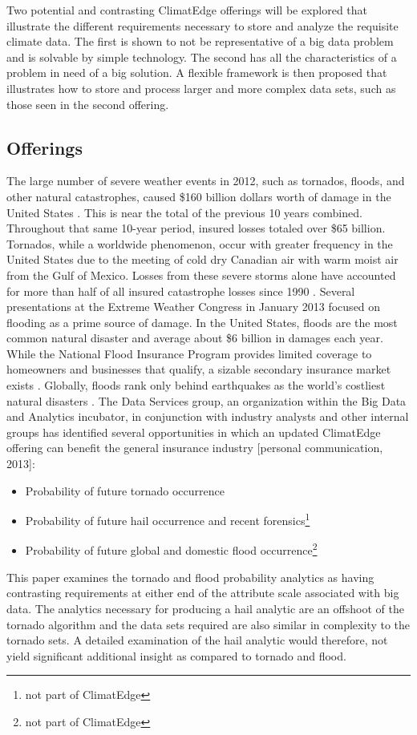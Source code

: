 Two potential and contrasting ClimatEdge offerings will be explored that illustrate the different requirements necessary to store and analyze the requisite climate data. The first is shown to not be representative of a big data problem and is solvable by simple technology. The second has all the characteristics of a problem in need of a big solution. A flexible framework is then proposed that illustrates how to store and process larger and more complex data sets, such as those seen in the second offering.
\subsection{Offerings}
The large number of severe weather events in 2012, such as tornados, floods, and other natural catastrophes, caused \$160 billion dollars worth of damage in the United States \cite{stalder}. This is near the total of the previous 10 years combined. Throughout that same 10-year period, insured losses totaled over \$65 billion. Tornados, while a worldwide phenomenon, occur with greater frequency in the United States due to the meeting of cold dry Canadian air with warm moist air from the Gulf of Mexico. Losses from these severe storms alone have accounted for more than half of all insured catastrophe losses since 1990 \cite{lloyds}. Several presentations at the Extreme Weather Congress in January 2013 focused on flooding as a prime source of damage. In the United States, floods are the most common natural disaster and average about \$6 billion in damages each year. While the National Flood Insurance Program provides limited coverage to homeowners and businesses that qualify, a sizable secondary insurance market exists \cite{hope}. Globally, floods rank only behind earthquakes as the world's costliest natural disasters \cite{li}. The Data Services group, an organization within the Big Data and Analytics incubator, in conjunction with industry analysts and other internal groups has identified several opportunities in which an updated ClimatEdge offering can benefit the general insurance industry [personal communication, 2013]:
\begin{itemize}
    \item Probability of future tornado occurrence
    \item Probability of future hail occurrence and recent forensics\footnote{not part of ClimatEdge}
    \item Probability of future global and domestic flood occurrence\footnote{not part of ClimatEdge}
\end{itemize}
This paper examines the tornado and flood probability analytics as having contrasting requirements at either end of the attribute scale associated with big data. The analytics necessary for producing a hail analytic are an offshoot of the tornado algorithm and the data sets required are also similar in complexity to the tornado sets. A detailed examination of the hail analytic would therefore, not yield significant additional insight as compared to tornado and flood.